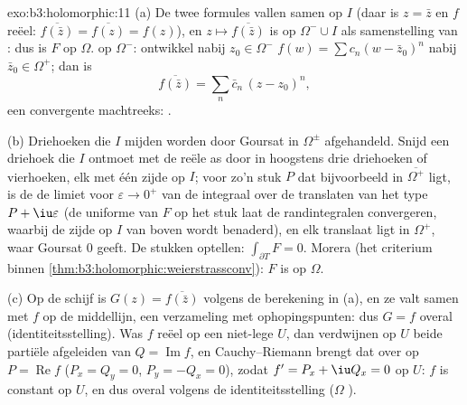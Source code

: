 \begin{solution}{exo:b3:holomorphic:11}
(a) De twee formules vallen samen op $I$ (daar is $z = \bar z$ en
$f$ reëel: $\overline{f(\bar z)} = \overline{f(z)} = f(z)$), en
$z \mapsto \overline{f(\bar z)}$ is  op $\Omega^-\cup I$
als samenstelling van : dus is $F$ 
op $\Omega$.  op $\Omega^-$: ontwikkel nabij $z_0 \in
\Omega^-$ $f(w) = \sum c_n(w - \bar z_0)^n$ nabij $\bar z_0 \in
\Omega^+$; dan is
\[
\overline{f(\bar z)} = \sum_n\bar c_n\,(z - z_0)^n,
\]
een convergente machtreeks: .

(b) Driehoeken die $I$ mijden worden door Goursat in $\Omega^\pm$
afgehandeld. Snijd een driehoek die $I$ ontmoet met de reële as
door in hoogstens drie driehoeken of vierhoeken, elk met één
zijde op $I$; voor zo'n stuk $P$ dat bijvoorbeeld in
$\overline{\Omega^+}$ ligt, is de  de limiet voor
$\varepsilon \to 0^+$ van de integraal over de translaten van het
type $P + \iu\varepsilon$ (de uniforme  van $F$ op
het  stuk laat de randintegralen convergeren, waarbij de
zijde op $I$ van boven wordt benaderd), en elk translaat ligt in
$\Omega^+$, waar Goursat $0$ geeft. De stukken optellen:
$\int_{\partial T}F = 0$. Morera (het criterium binnen
\cref{thm:b3:holomorphic:weierstrassconv}): $F$ is  op
$\Omega$.

(c) Op de schijf is $G(z) = \overline{f(\bar z)}$ 
volgens de berekening in (a), en ze valt samen met $f$ op de
middellijn, een verzameling met ophopingspunten: dus $G = f$
overal (identiteitsstelling). Was $f$ reëel op een niet-lege  $U$, dan verdwijnen op $U$ beide partiële afgeleiden
van $Q = \operatorname{Im}f$, en Cauchy--Riemann brengt dat over
op $P = \operatorname{Re}f$ ($P_x = Q_y = 0$, $P_y = -Q_x = 0$),
zodat $f' = P_x + \iu Q_x = 0$ op $U$: $f$ is constant op $U$, en
dus overal volgens de identiteitsstelling ($\Omega$
).
\end{solution}

